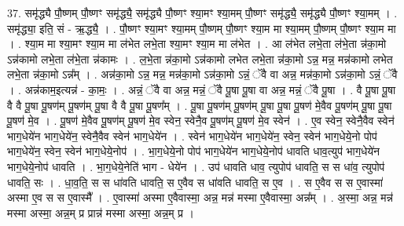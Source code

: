 \documentclass[17pt]{extarticle}
\begin{document}
37. समृ॑द्ध्यै पौ॒ष्णम् पौ॒ष्णꣳ समृ॑द्ध्यै॒ समृ॑द्ध्यै पौ॒ष्णꣳ श्या॒मꣳ श्या॒मम् पौ॒ष्णꣳ समृ॑द्ध्यै॒ समृ॑द्ध्यै पौ॒ष्णꣳ श्या॒मम् । . समृ॑द्ध्या॒ इति॒ सं - ऋ॒द्ध्यै॒ । . पौ॒ष्णꣳ श्या॒मꣳ श्या॒मम् पौ॒ष्णम् पौ॒ष्णꣳ श्या॒म मा श्या॒मम् पौ॒ष्णम् पौ॒ष्णꣳ श्या॒म मा । . श्या॒म मा श्या॒मꣳ श्या॒म मा ल॑भेत लभे॒ता श्या॒मꣳ श्या॒म मा ल॑भेत । . आ ल॑भेत लभे॒ता ल॑भे॒ता न्न॑का॒मो ऽन्न॑कामो लभे॒ता ल॑भे॒ता न्न॑कामः । . ल॒भे॒ता न्न॑का॒मो ऽन्न॑कामो लभेत लभे॒ता न्न॑का॒मो ऽन्न॒ मन्न॒ मन्न॑कामो लभेत लभे॒ता न्न॑का॒मो ऽन्न᳚म् । . अन्न॑का॒मो ऽन्न॒ मन्न॒ मन्न॑का॒मो ऽन्न॑का॒मो ऽन्नं॒ ॅवै वा अन्न॒ मन्न॑का॒मो ऽन्न॑का॒मो ऽन्नं॒ ॅवै । . अन्न॑काम॒इत्यन्न॑ - का॒मः॒ । . अन्नं॒ ॅवै वा अन्न॒ मन्नं॒ ॅवै पू॒षा पू॒षा वा अन्न॒ मन्नं॒ ॅवै पू॒षा । . वै पू॒षा पू॒षा वै वै पू॒षा पू॒षण॑म् पू॒षण॑म् पू॒षा वै वै पू॒षा पू॒षण᳚म् । . पू॒षा पू॒षण॑म् पू॒षण॑म् पू॒षा पू॒षा पू॒षण॑ मे॒वैव पू॒षण॑म् पू॒षा पू॒षा पू॒षण॑ मे॒व । . पू॒षण॑ मे॒वैव पू॒षण॑म् पू॒षण॑ मे॒व स्वेन॒ स्वेनै॒व पू॒षण॑म् पू॒षण॑ मे॒व स्वेन॑ । . ए॒व स्वेन॒ स्वेनै॒वैव स्वेन॑ भाग॒धेये॑न भाग॒धेये॑न॒ स्वेनै॒वैव स्वेन॑ भाग॒धेये॑न । . स्वेन॑ भाग॒धेये॑न भाग॒धेये॑न॒ स्वेन॒ स्वेन॑ भाग॒धेये॒नो पोप॑ भाग॒धेये॑न॒ स्वेन॒ स्वेन॑ भाग॒धेये॒नोप॑ । . भा॒ग॒धेये॒नो पोप॑ भाग॒धेये॑न भाग॒धेये॒नोप॑ धावति धाव॒त्युप॑ भाग॒धेये॑न भाग॒धेये॒नोप॑ धावति । . भा॒ग॒धेये॒नेति॑ भाग - धेये॑न । . उप॑ धावति धाव॒ त्युपोप॑ धावति॒ स स धा॑व॒ त्युपोप॑ धावति॒ सः । . धा॒व॒ति॒ स स धा॑वति धावति॒ स ए॒वैव स धा॑वति धावति॒ स ए॒व । . स ए॒वैव स स ए॒वास्मा॑ अस्मा ए॒व स स ए॒वास्मै᳚ । . ए॒वास्मा॑ अस्मा ए॒वैवास्मा॒ अन्न॒ मन्न॑ मस्मा ए॒वैवास्मा॒ अन्न᳚म् । . अ॒स्मा॒ अन्न॒ मन्न॑ मस्मा अस्मा॒ अन्न॒म् प्र प्रान्न॑ मस्मा अस्मा॒ अन्न॒म् प्र । \newline
\pagebreak
{}
\end{document}
